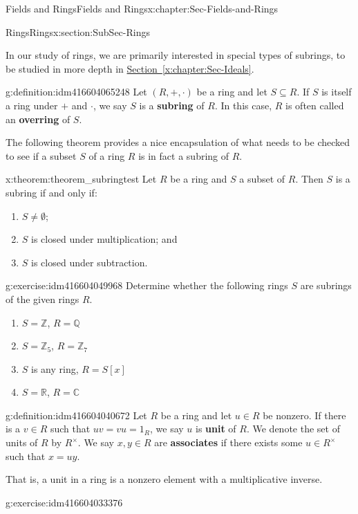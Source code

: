 \documentclass[oneside,10pt,]{book}
\newcommand{\terminology}[1]{\textbf{#1}}
\numberwithin{equation}{section}
\def\C{{\mathbb C}}
\def\Z{{\mathbb Z}}
\def\Q{{\mathbb Q}}
\def\R{{\mathbb R}}
\begin{document}
\begin{chapterptx}{Fields and Rings}{}{Fields and Rings}{}{}{x:chapter:Sec-Fields-and-Rings}
\begin{sectionptx}{Rings}{}{Rings}{}{}{x:section:SubSec-Rings}
\par
In our study of rings, we are primarily interested in special types of subrings, to be studied in more depth in \hyperref[x:chapter:Sec-Ideals]{Section~\ref{x:chapter:Sec-Ideals}}.%
\begin{definition}{}{g:definition:idm416604065248}%
Let \((R,+,\cdot)\) be a ring and let \(S\subseteq R\). If \(S\) is itself a ring under \(+\) and \(\cdot\), we say \(S\) is a \terminology{subring} of \(R\). In this case, \(R\) is often called an \terminology{overring} of \(S\).%
\end{definition}
The following theorem provides a nice encapsulation of what needs to be checked to see if a subset \(S\) of a ring \(R\) is in fact a subring of \(R\).%
\begin{theorem}{}{}{x:theorem:theorem_subringtest}%
Let \(R\) be a ring and \(S\) a subset of \(R\). Then \(S\) is a subring if and only if:%
\begin{enumerate}
\item{}\(S\ne \emptyset\);%
\item{}\(S\) is closed under multiplication; and%
\item{}\(S\) is closed under subtraction.%
\end{enumerate}
%
\end{theorem}
\begin{inlineexercise}{}{g:exercise:idm416604049968}%
Determine whether the following rings \(S\) are subrings of the given rings \(R\).%
\begin{enumerate}
\item{}\(S = \Z\), \(R = \Q\)%
\item{}\(S = \Z_{5}\), \(R = \Z_{7}\)%
\item{}\(S\) is any ring, \(R = S[x]\)%
\item{}\(S = \R\), \(R = \C\)%
\end{enumerate}
%
\end{inlineexercise}
\begin{definition}{}{g:definition:idm416604040672}%
Let \(R\) be a ring and let \(u\in R\) be nonzero. If there is a \(v\in R\) such that \(uv = vu = 1_R\), we say \(u\) is \terminology{unit} of \(R\). We denote the set of units of \(R\) by \(R^\times\). We say \(x,y\in R\) are \terminology{associates} if there exists some \(u\in R^\times\) such that \(x = uy\).%
\end{definition}
That is, a unit in a ring is a nonzero element with a multiplicative inverse.%
\begin{inlineexercise}{}{g:exercise:idm416604033376}%

\end{inlineexercise}
\end{sectionptx}
\end{chapterptx}
\end{document}

